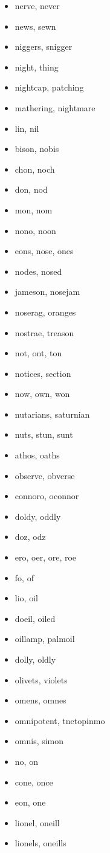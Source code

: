 \documentclass[a4wide,11pt]{report}
\begin{document}
\begin{itemize}
  \item nerve, never
  \item news, sewn
  \item niggers, snigger
  \item night, thing
  \item nightcap, patching
  \item mathering, nightmare
  \item lin, nil
  \item bison, nobis
  \item chon, noch
  \item don, nod
  \item mon, nom
  \item nono, noon
  \item eons, nose, ones
  \item nodes, nosed
  \item jameson, nosejam
  \item noserag, oranges
  \item nostrae, treason
  \item not, ont, ton
  \item notices, section
  \item now, own, won
  \item nutarians, saturnian
  \item nuts, stun, sunt
  \item athos, oaths
  \item observe, obverse
  \item connoro, oconnor
  \item doldy, oddly
  \item doz, odz
  \item ero, oer, ore, roe
  \item fo, of
  \item lio, oil
  \item doeil, oiled
  \item oillamp, palmoil
  \item dolly, oldly
  \item olivets, violets
  \item omens, omnes
  \item omnipotent, tnetopinmo
  \item omnis, simon
  \item no, on
  \item cone, once
  \item eon, one
  \item lionel, oneill
  \item lionels, oneills

\end{itemize}
\end{document}
